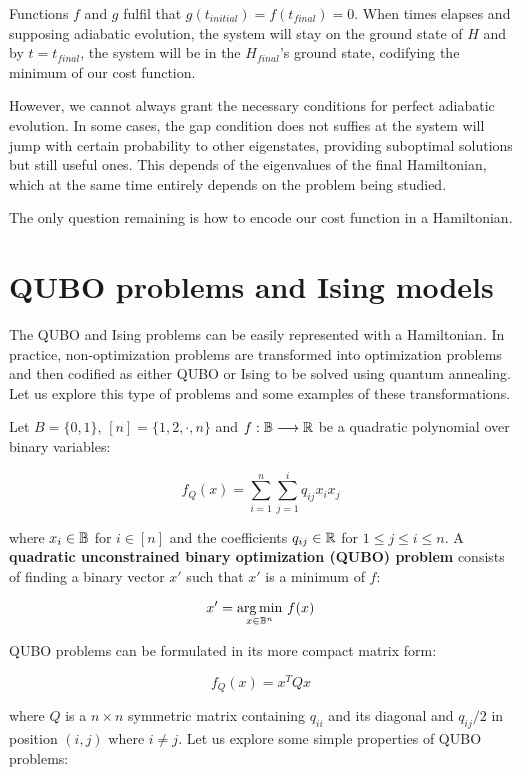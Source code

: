 Functions $f$ and $g$ fulfil that $g(t_{initial}) = f(t_{final}) = 0$. When times elapses and supposing adiabatic evolution, the system will stay on the ground state of $H$ and by $t = t_{final}$, the system will be in the $H_{final}$'s ground state, codifying the minimum of our cost function.

However, we cannot always grant the necessary conditions for perfect adiabatic evolution. In some cases, the gap condition does not suffies at the system will jump with certain probability to other eigenstates, providing suboptimal solutions but still useful ones. This depends of the eigenvalues of the final Hamiltonian, which at the same time entirely depends on the problem being studied.

The only question remaining is how to encode our cost function in a Hamiltonian.


\section{QUBO problems and Ising models}


The QUBO and Ising problems can be easily represented with a Hamiltonian. In practice, non-optimization problems are transformed into optimization problems and then codified as either QUBO or Ising to be solved using quantum annealing. Let us explore this type of problems and some examples of these transformations.

Let $B = \{0,1\}$, $[n] = \{1, 2, \cdot, n\}$ and $f: \mathbb{B} \longrightarrow \mathbb{R} $ be a quadratic polynomial over binary variables:

$$ f_Q(x) = \sum_{i=1}^n \sum_{j=1}^i q_{ij} x_i x_j $$

where $x_i \in \mathbb{B}$ for $i \in [n]$ and the coefficients $q_{ij} \in \mathbb{R}$ for $1 \leq j \leq i \leq n$. A \textbf{quadratic unconstrained binary optimization (QUBO) problem} consists of finding a binary vector $x'$ such that $x'$ is a minimum of $f$:

$$ x' = \underset {x \in \mathbb{B}^n }{\arg \min} ~ f(x) $$

QUBO problems can be formulated in its more compact matrix form:

$$ f_Q(x) = x^T Q x $$

where $Q$ is a $n \times n$ symmetric matrix containing $q_{ii}$ and its diagonal and $q_{ij} / 2$ in position $(i,j)$ where $i \neq j$. Let us explore some simple properties of QUBO problems:

